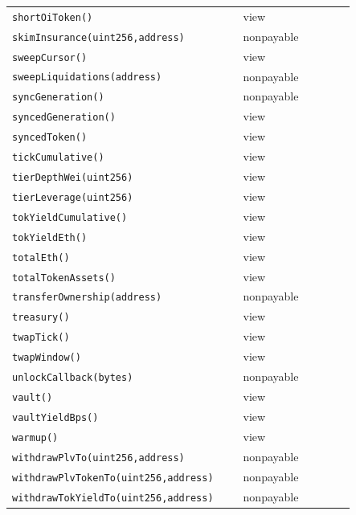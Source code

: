 \begin{longtable}{@{}p{0.62\linewidth}p{0.30\linewidth}@{}}
\texttt{\scriptsize shortOiToken()} & view \\
\texttt{\scriptsize skimInsurance(uint256,address)} & nonpayable \\
\texttt{\scriptsize sweepCursor()} & view \\
\texttt{\scriptsize sweepLiquidations(address)} & nonpayable \\
\texttt{\scriptsize syncGeneration()} & nonpayable \\
\texttt{\scriptsize syncedGeneration()} & view \\
\texttt{\scriptsize syncedToken()} & view \\
\texttt{\scriptsize tickCumulative()} & view \\
\texttt{\scriptsize tierDepthWei(uint256)} & view \\
\texttt{\scriptsize tierLeverage(uint256)} & view \\
\texttt{\scriptsize tokYieldCumulative()} & view \\
\texttt{\scriptsize tokYieldEth()} & view \\
\texttt{\scriptsize totalEth()} & view \\
\texttt{\scriptsize totalTokenAssets()} & view \\
\texttt{\scriptsize transferOwnership(address)} & nonpayable \\
\texttt{\scriptsize treasury()} & view \\
\texttt{\scriptsize twapTick()} & view \\
\texttt{\scriptsize twapWindow()} & view \\
\texttt{\scriptsize unlockCallback(bytes)} & nonpayable \\
\texttt{\scriptsize vault()} & view \\
\texttt{\scriptsize vaultYieldBps()} & view \\
\texttt{\scriptsize warmup()} & view \\
\texttt{\scriptsize withdrawPlvTo(uint256,address)} & nonpayable \\
\texttt{\scriptsize withdrawPlvTokenTo(uint256,address)} & nonpayable \\
\texttt{\scriptsize withdrawTokYieldTo(uint256,address)} & nonpayable \\
\bottomrule\end{longtable}

